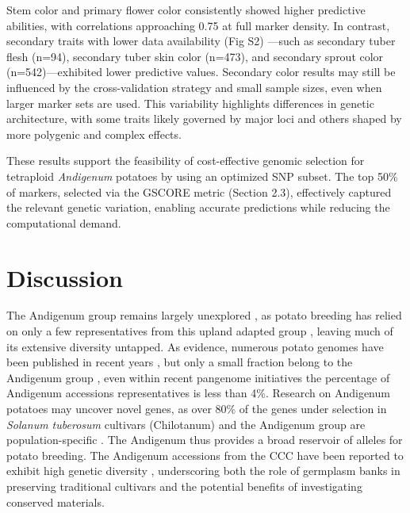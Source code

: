\documentclass[pdflatex,sn-mathphys-ay]{sn-jnl}%
\begin{document}
Stem color and primary flower color consistently showed higher predictive abilities, with correlations approaching 0.75 at full marker density. In contrast, secondary traits with lower data availability (Fig S2) —such as secondary tuber flesh (n=94), secondary tuber skin color (n=473), and secondary sprout color (n=542)—exhibited lower predictive values. Secondary color results may still be influenced by the cross-validation strategy and small sample sizes, even when larger marker sets are used. This variability highlights differences in genetic architecture, with some traits likely governed by major loci and others shaped by more polygenic and complex effects.

These results support the feasibility of cost-effective genomic selection for tetraploid \textit{Andigenum} potatoes by using an optimized SNP subset. The top 50\% of markers, selected via the GSCORE metric (Section 2.3), effectively captured the relevant genetic variation, enabling accurate predictions while reducing the computational demand.









\section{Discussion}




The Andigenum group remains largely unexplored \citep{ghislain2020genes}, as potato breeding has relied on only a few representatives from this upland adapted group \citep{spanoghe2022genetic}, leaving much of its extensive diversity untapped. As evidence, numerous potato genomes have been published in recent years \citep{zhou2020haplotype, campoy2020gamete, sun2022chromosome,  bao2022genome}, but only a small fraction belong to the Andigenum group \citep{kanehisa2016blastkoala, diacolg3}, even within recent pangenome initiatives \citep{hoopes2022phased,guo2023pangenome,Bozan2023} the percentage of Andigenum accessions representatives is less than 4\%. Research on Andigenum potatoes may uncover novel genes, as over 80\% of the genes under selection in \textit{Solanum tuberosum} cultivars (Chilotanum) and the Andigenum group are population-specific \citep{hardigan2017genome}. The Andigenum thus provides a broad reservoir of alleles for potato breeding. The Andigenum accessions from the CCC have been reported to exhibit high genetic diversity \citep{Berdugo2017}, underscoring both the role of germplasm banks in preserving traditional cultivars and the potential benefits of investigating conserved materials.
\end{document}
